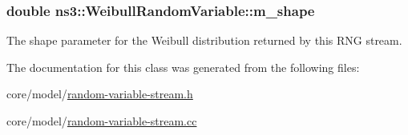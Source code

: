 \subsubsection[{\texorpdfstring{m\+\_\+shape}{m_shape}}]{\setlength{\rightskip}{0pt plus 5cm}double ns3\+::\+Weibull\+Random\+Variable\+::m\+\_\+shape\hspace{0.3cm}{\ttfamily [private]}}\hypertarget{classns3_1_1WeibullRandomVariable_a2bdace237fb231000449198efd0f9c01}{}\label{classns3_1_1WeibullRandomVariable_a2bdace237fb231000449198efd0f9c01}
The shape parameter for the Weibull distribution returned by this R\+NG stream. 

The documentation for this class was generated from the following files\+:\begin{DoxyCompactItemize}
\item 
core/model/\hyperlink{random-variable-stream_8h}{random-\/variable-\/stream.\+h}\item 
core/model/\hyperlink{random-variable-stream_8cc}{random-\/variable-\/stream.\+cc}\end{DoxyCompactItemize}
